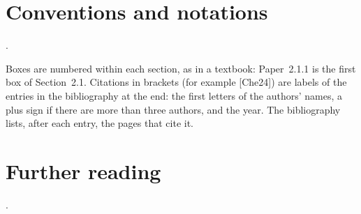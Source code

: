 \section{Conventions and notations}

.

Boxes are numbered within each section, as in a textbook: Paper~2.1.1 is the first box of Section~2.1. Citations in
brackets (for example [Che24]) are labels of the entries in the bibliography at the end: the first letters of the
authors' names, a plus sign if there are more than three authors, and the year. The bibliography lists, after each
entry, the pages that cite it.

\section{Further reading}

.

